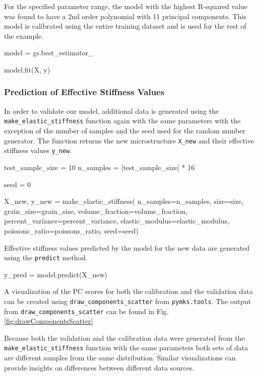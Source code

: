 \documentclass{bmcart}
\begin{document}
    For the specified parameter range, the model with the highest R-squared
value was found to have a 2nd order polynomial with 11 principal
components. This model is calibrated using the entire training dataset and is
used for the rest of the example.

\begin{_input}
model = gs.best_estimator_

model.fit(X, y)
\end{_input}

    \subsubsection{Prediction of Effective Stiffness Values}\label{prediction-using-mkshomogenizationmodel}

In order to validate our model, additional data is generated using the
\texttt{make\_elastic\_stiffness} function again with the same
parameters with the exception of the number of samples and the seed used
for the random number generator. The function returns the new
microstructure \texttt{X\_new} and their effective stiffness values
\texttt{y\_new}.

\begin{_input}
test_sample_size = 10
n_samples = [test_sample_size] * 16

seed = 0

X_new, y_new = make_elastic_stiffness(
    n_samples=n_samples, size=size, 
    grain_size=grain_size,
    volume_fraction=volume_fraction, 
    percent_variance=percent_variance,
    elastic_modulus=elastic_modulus, 
    poissons_ratio=poissons_ratio, 
    seed=seed)
\end{_input}
    Effective stiffness values predicted by the model for the new
data are generated using the \texttt{predict} method.

\begin{_input}
y_pred = model.predict(X_new)
\end{_input}

    A visualization of the PC scores for both the
calibration and the validation data can be created using
\texttt{draw\_components\_scatter} from \texttt{pymks.tools}. The output from
\texttt{draw\_components\_scatter} can be found in Fig. \ref{fig:drawComponentsScatter}

Because both the validation and the calibration data were generated from
the \texttt{make\_elastic\_stiffness} function with the same parameters
both sets of data are different samples from the same distribution.
Similar visualizations can provide insights on differences between
different data sources.
\end{document}
